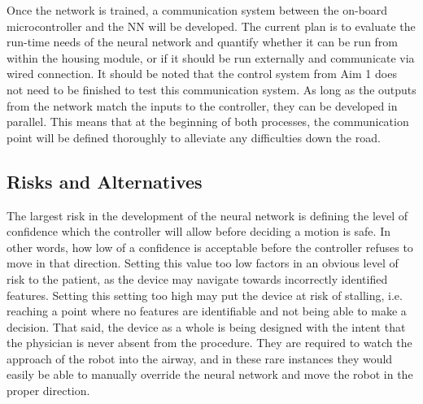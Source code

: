Once the network is trained, a communication system between the on-board microcontroller and the NN will be developed. The current plan is to evaluate the run-time needs of the neural network and quantify whether it can be run from within the housing module, or if it should be run externally and communicate via wired connection. It should be noted that the control system from Aim 1 does not need to be finished to test this communication system. As long as the outputs from the network match the inputs to the controller, they can be developed in parallel. This means that at the beginning of both processes, the communication point will be defined thoroughly to alleviate any difficulties down the road.

\subsection{Risks and Alternatives}

The largest risk in the development of the neural network is defining the level of confidence which the controller will allow before deciding a motion is safe. In other words, how low of a confidence is acceptable before the controller refuses to move in that direction. Setting this value too low factors in an obvious level of risk to the patient, as the device may navigate towards incorrectly identified features. Setting this setting too high may put the device at risk of stalling, i.e. reaching a point where no features are identifiable and not being able to make a decision. That said, the device as a whole is being designed with the intent that the physician is never absent from the procedure. They are required to watch the approach of the robot into the airway, and in these rare instances they would easily be able to manually override the neural network and move the robot in the proper direction.